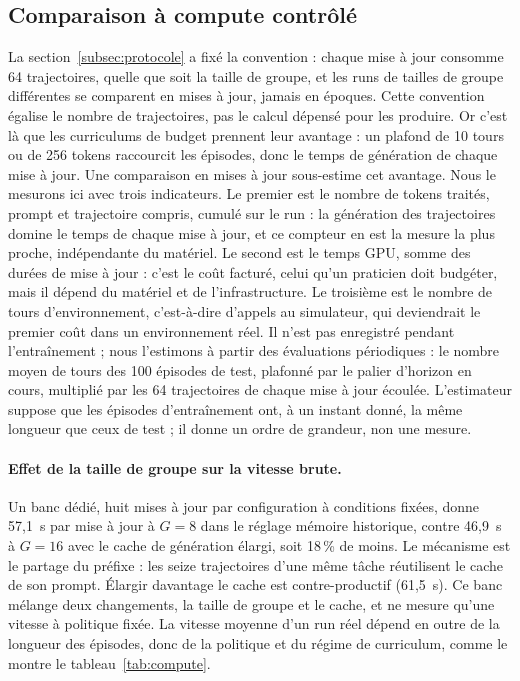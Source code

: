 \documentclass[11pt,a4paper]{article}
\begin{document}
\subsection{Comparaison à compute contrôlé}
\label{subsec:compute-controle}

La section~\ref{subsec:protocole} a fixé la convention : chaque mise à jour consomme 64 trajectoires, quelle que soit la taille de groupe, et les runs de tailles de groupe différentes se comparent en mises à jour, jamais en époques. Cette convention égalise le nombre de trajectoires, pas le calcul dépensé pour les produire. Or c'est là que les curriculums de budget prennent leur avantage : un plafond de 10 tours ou de 256 tokens raccourcit les épisodes, donc le temps de génération de chaque mise à jour. Une comparaison en mises à jour sous-estime cet avantage. Nous le mesurons ici avec trois indicateurs. Le premier est le nombre de tokens traités, prompt et trajectoire compris, cumulé sur le run : la génération des trajectoires domine le temps de chaque mise à jour, et ce compteur en est la mesure la plus proche, indépendante du matériel. Le second est le temps GPU, somme des durées de mise à jour : c'est le coût facturé, celui qu'un praticien doit budgéter, mais il dépend du matériel et de l'infrastructure. Le troisième est le nombre de tours d'environnement, c'est-à-dire d'appels au simulateur, qui deviendrait le premier coût dans un environnement réel. Il n'est pas enregistré pendant l'entraînement ; nous l'estimons à partir des évaluations périodiques : le nombre moyen de tours des 100 épisodes de test, plafonné par le palier d'horizon en cours, multiplié par les 64 trajectoires de chaque mise à jour écoulée. L'estimateur suppose que les épisodes d'entraînement ont, à un instant donné, la même longueur que ceux de test ; il donne un ordre de grandeur, non une mesure.

\paragraph{Effet de la taille de groupe sur la vitesse brute.} Un banc dédié, huit mises à jour par configuration à conditions fixées, donne 57{,}1~s par mise à jour à $G=8$ dans le réglage mémoire historique, contre 46{,}9~s à $G=16$ avec le cache de génération élargi, soit 18\,\% de moins. Le mécanisme est le partage du préfixe : les seize trajectoires d'une même tâche réutilisent le cache de son prompt. Élargir davantage le cache est contre-productif (61{,}5~s). Ce banc mélange deux changements, la taille de groupe et le cache, et ne mesure qu'une vitesse à politique fixée. La vitesse moyenne d'un run réel dépend en outre de la longueur des épisodes, donc de la politique et du régime de curriculum, comme le montre le tableau~\ref{tab:compute}.
\end{document}
